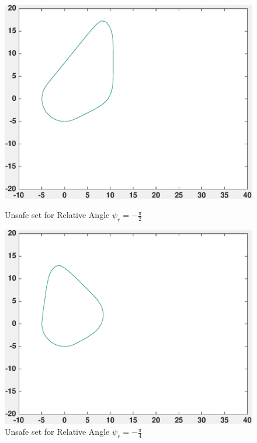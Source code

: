 \documentclass[a4paper]{article}
\begin{document}
\begin{figure}[!ht]
  \centering
  \begin{minipage}[b]{0.4\textwidth}
    \includegraphics[width=1.0\textwidth]{velCont_psi37.eps}
    \caption{Unsafe set for Relative Angle $\psi_r = -\frac{\pi}{2}$}
  \end{minipage}
  \hfill
  \begin{minipage}[b]{0.4\textwidth}
    \includegraphics[width=1.0\textwidth]{velCont_psi43.eps}
    \caption{Unsafe set for Relative Angle $\psi_r = -\frac{\pi}{4}$}
  \end{minipage}
\end{figure}
\end{document}
